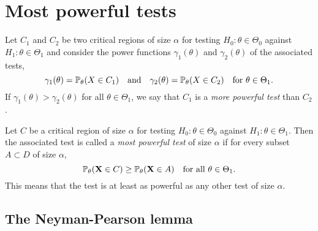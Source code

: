 
\section{Most powerful tests}\label{sec:most_powerful_tests}

\begin{definition}
Let $C_1$ and $C_2$ be two critical regions of size $\alpha$ for testing $H_0:\theta\in\Theta_0$ against $H_1:\theta\in\Theta_1$ and consider the power functions $\gamma_1(\theta)$ and $\gamma_2(\theta)$ of the associated tests, 
\[
\gamma_1(\theta) = \mathbb{P}_{\theta}(X\in C_1) \quad\text{and}\quad \gamma_2(\theta) = \mathbb{P}_{\theta}(X\in C_2) \quad\text{for $\theta\in\Theta_1$.}
\]
If $\gamma_1(\theta) > \gamma_2(\theta)$ for all $\theta\in\Theta_1$, we say that $C_1$ is a \emph{more powerful test} than $C_2$. 
\end{definition}

\begin{definition}
Let $C$ be a critical region of size $\alpha$ for testing $H_0:\theta\in\Theta_0$ against $H_1:\theta\in\Theta_1$. Then the associated test is called a \emph{most powerful test} of size $\alpha$ if for every subset $A\subset D$ of size $\alpha$,
\[
\mathbb{P}_{\theta}(\mathbf{X}\in C) \geq \mathbb{P}_{\theta}(\mathbf{X}\in A) \quad\text{for all $\theta\in\Theta_1$.}
\]
This means that the test is at least as powerful as any other test of size $\alpha$.
\end{definition}

\subsection{The Neyman-Pearson lemma}

